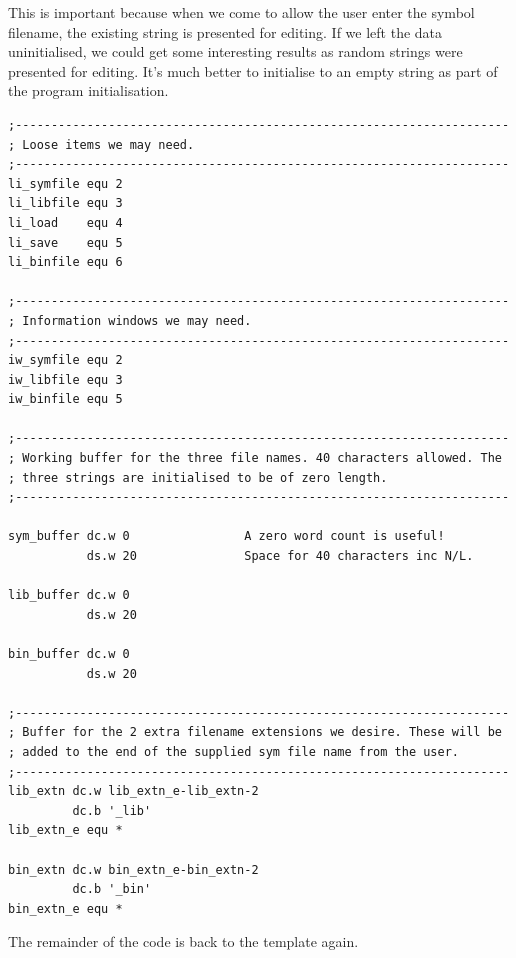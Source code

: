 This is important because when we come to allow the user enter the
    symbol filename, the existing string is presented for editing. If we left
    the data uninitialised, we could get some interesting results as random
    strings were presented for editing. It's much better to initialise to an
    empty string as part of the program initialisation.

\begin{lstlisting}[firstnumber=1,]
;---------------------------------------------------------------------
; Loose items we may need.
;---------------------------------------------------------------------
li_symfile equ 2
li_libfile equ 3
li_load    equ 4
li_save    equ 5
li_binfile equ 6

;---------------------------------------------------------------------
; Information windows we may need.
;---------------------------------------------------------------------
iw_symfile equ 2
iw_libfile equ 3
iw_binfile equ 5

;---------------------------------------------------------------------
; Working buffer for the three file names. 40 characters allowed. The
; three strings are initialised to be of zero length.
;---------------------------------------------------------------------

sym_buffer dc.w 0                A zero word count is useful!
           ds.w 20               Space for 40 characters inc N/L.

lib_buffer dc.w 0
           ds.w 20

bin_buffer dc.w 0
           ds.w 20

;---------------------------------------------------------------------
; Buffer for the 2 extra filename extensions we desire. These will be
; added to the end of the supplied sym file name from the user.
;---------------------------------------------------------------------
lib_extn dc.w lib_extn_e-lib_extn-2
         dc.b '_lib'
lib_extn_e equ *

bin_extn dc.w bin_extn_e-bin_extn-2
         dc.b '_bin'
bin_extn_e equ *
\end{lstlisting}

The remainder of the code is back to the template again.

